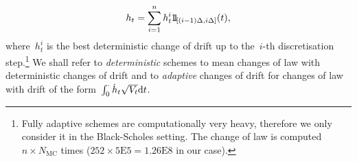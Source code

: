$$
h_t=\sum_{i=1}^{n} h^i_t \, \ind_{[(i-1)\Delta, i\Delta]}(t),
$$
where~$h^i_t$ is the best deterministic change of drift up to the~$i$-th discretisation step.\footnote{Fully adaptive schemes are  computationally very heavy, therefore we only consider it in the Black-Scholes setting. 
The change of law is computed~$n \times N_{\text{MC}}$ times ($252 \times 5\mathrm{E}5 = 1.26\mathrm{E}8$ in our case).} %
We shall refer to \textit{deterministic} schemes
to mean changes of law with deterministic changes of drift and to \textit{adaptive} changes of drift 
for changes of law with drift of the form~$\int_0^\cdot \dot{h}_t\sqrt{V_t}\mathrm{d} t$.

